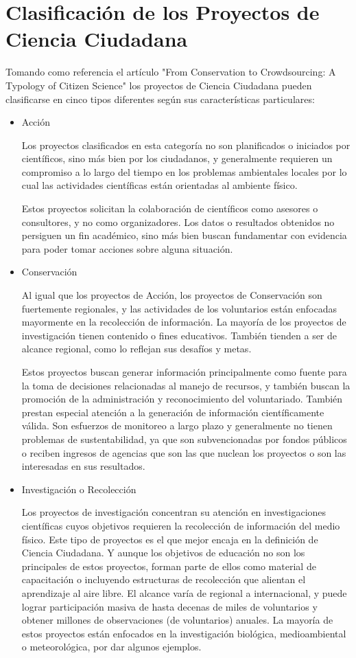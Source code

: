 \section{Clasificación de los Proyectos de Ciencia Ciudadana}
	
	Tomando como referencia el artículo "From Conservation to Crowdsourcing: A Typology of Citizen Science" los proyectos de Ciencia Ciudadana pueden clasificarse en cinco tipos diferentes según sus características particulares:

\begin{itemize}
	\item {Acción}
		
		Los proyectos clasificados en esta categoría no son planificados o iniciados por científicos, sino más bien por los ciudadanos, y generalmente requieren un compromiso a lo largo del tiempo en los problemas ambientales locales por lo cual las actividades científicas están orientadas al ambiente físico. 
		
		Estos proyectos solicitan la colaboración de científicos como asesores o consultores, y no como organizadores. Los datos o resultados obtenidos no persiguen un fin académico, sino más bien buscan fundamentar con evidencia para poder tomar acciones sobre alguna situación. 
	\item {Conservación} 
	
	Al igual que los proyectos de Acción, los proyectos de Conservación son fuertemente regionales, y las actividades de los voluntarios están enfocadas mayormente en la recolección de información. La mayoría de los proyectos de investigación tienen contenido o fines educativos. También tienden a ser de alcance regional, como lo reflejan sus desafíos y metas.
	
	Estos proyectos buscan generar información principalmente como fuente para la toma de decisiones relacionadas al manejo de recursos, y también buscan la promoción de la administración y reconocimiento del voluntariado. También prestan especial atención a la generación de información científicamente válida. Son esfuerzos de monitoreo a largo plazo y generalmente no tienen problemas de sustentabilidad, ya que son subvencionadas por fondos públicos o reciben ingresos de agencias que son las que nuclean los proyectos o son las interesadas en sus resultados.
	
	\item {Investigación o Recolección} 
	
	Los proyectos de investigación concentran su atención en investigaciones científicas cuyos objetivos requieren la recolección de información del medio físico. Este tipo de proyectos es el que mejor encaja en la definición de Ciencia Ciudadana. Y aunque los objetivos de educación no son los principales de estos proyectos, forman parte de ellos como material de capacitación o incluyendo estructuras de recolección que alientan el aprendizaje al aire libre. El alcance varía de regional a internacional, y puede lograr participación masiva de hasta decenas de miles de voluntarios y obtener millones de observaciones (de voluntarios) anuales. La mayoría de estos proyectos están enfocados en la investigación biológica, medioambiental o meteorológica, por dar algunos ejemplos. 
	

\end{itemize}
